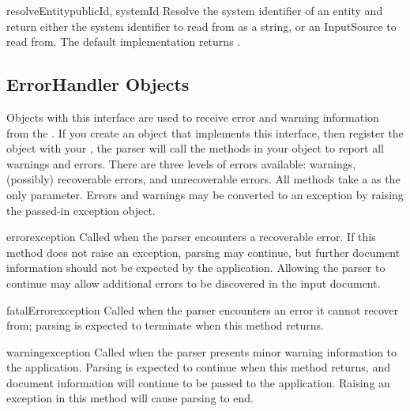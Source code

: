 \begin{methoddesc}[EntityResolver]{resolveEntity}{publicId, systemId}
  Resolve the system identifier of an entity and return either the
  system identifier to read from as a string, or an InputSource to
  read from. The default implementation returns .
\end{methoddesc}


\subsection{ErrorHandler Objects \label{sax-error-handler}}

Objects with this interface are used to receive error and warning
information from the .  If you create an object that
implements this interface, then register the object with your
, the parser will call the methods in your object to
report all warnings and errors. There are three levels of errors
available: warnings, (possibly) recoverable errors, and unrecoverable
errors.  All methods take a  as the only
parameter.  Errors and warnings may be converted to an exception by
raising the passed-in exception object.

\begin{methoddesc}[ErrorHandler]{error}{exception}
  Called when the parser encounters a recoverable error.  If this method
  does not raise an exception, parsing may continue, but further document
  information should not be expected by the application.  Allowing the
  parser to continue may allow additional errors to be discovered in the
  input document.
\end{methoddesc}

\begin{methoddesc}[ErrorHandler]{fatalError}{exception}
  Called when the parser encounters an error it cannot recover from;
  parsing is expected to terminate when this method returns.
\end{methoddesc}

\begin{methoddesc}[ErrorHandler]{warning}{exception}
  Called when the parser presents minor warning information to the
  application.  Parsing is expected to continue when this method returns,
  and document information will continue to be passed to the application.
  Raising an exception in this method will cause parsing to end.
\end{methoddesc}
